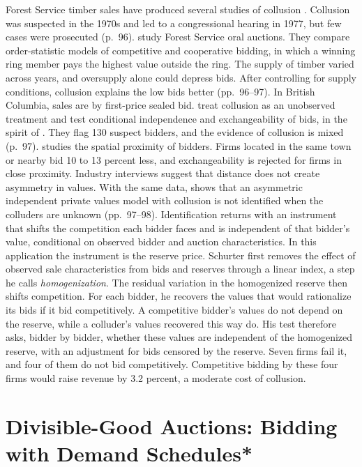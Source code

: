 Forest Service timber sales have produced several studies of collusion
\citep[Section~2.5]{HortacsuPerrigne2021}. Collusion was suspected in the 1970s and led to a congressional
hearing in 1977, but few cases were prosecuted (p.~96). \citet{BaldwinMarshallRichard1997} study Forest
Service oral auctions. They compare order-statistic models of competitive and cooperative bidding, in which a
winning ring member pays the highest value outside the ring. The supply of timber varied across years, and
oversupply alone could depress bids. After controlling for supply conditions, collusion explains the low bids
better (pp.~96--97). In British Columbia, sales are by first-price sealed bid. \citet{ListMillimetPrice2007}
treat collusion as an unobserved treatment and test conditional independence and exchangeability of bids, in
the spirit of \citet{BajariYe2003}. They flag 130 suspect bidders, and the evidence of collusion is mixed
(p.~97). \citet{Price2008} studies the spatial proximity of bidders. Firms located in the same town or nearby
bid 10 to 13 percent less, and exchangeability is rejected for firms in close proximity. Industry interviews
suggest that distance does not create asymmetry in values. With the same data, \citet{Schurter2020} shows that
an asymmetric independent private values model with collusion is not identified when the colluders are
unknown (pp.~97--98). Identification returns with an instrument that shifts the competition each bidder
faces and is independent of that bidder's value, conditional on observed bidder and auction
characteristics. In this application the instrument is the reserve price. Schurter first removes the
effect of observed sale characteristics from bids and reserves through a linear index, a step he calls
\emph{homogenization}. The residual variation in the homogenized reserve then shifts competition. For
each bidder, he recovers the values that would rationalize its bids if it bid competitively. A competitive
bidder's values do not depend on the reserve, while a colluder's values recovered this way do. His test
therefore asks, bidder by bidder, whether these values are independent of the homogenized reserve, with an
adjustment for bids censored by the reserve. Seven firms fail it, and four of them do not bid
competitively. Competitive bidding by these four
firms would raise revenue by 3.2 percent, a moderate cost of collusion.

\section{Divisible-Good Auctions: Bidding with Demand Schedules*}\label{sec:15-divisible}

